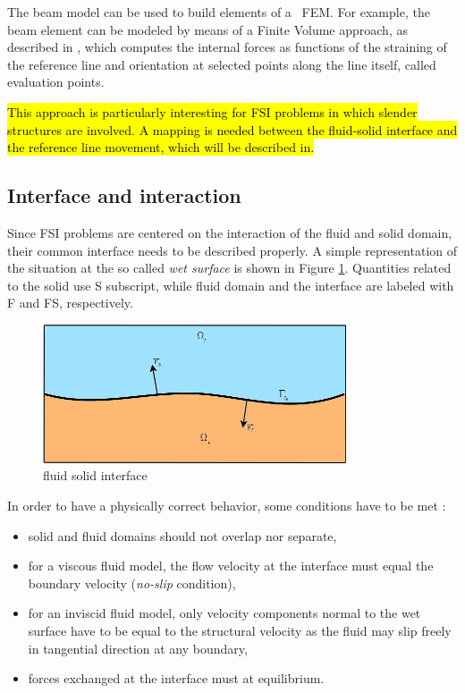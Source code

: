The beam model can be used to build elements of a ~\ac{FEM}. For example, the beam element can be modeled by means of a Finite Volume approach, as described in \cite{ghiringhelli2000multibody}, which computes the internal forces as functions of the straining of the reference line and orientation at selected points along the line itself, called evaluation points.

\hl{This approach is particularly interesting for FSI problems in which slender structures are involved. A mapping is needed between the fluid-solid interface and the reference line movement, which will be described in.}


\subsection{Interface and interaction}
\label{sec:interface}

Since FSI problems are centered on the interaction of the fluid and solid domain, their common interface needs to be described properly. A simple representation of the situation at the so called \textit{wet surface} is shown in Figure \ref{fig:interface}. Quantities related to the solid use S subscript, while fluid domain and the interface are labeled with F and FS, respectively. 

\begin{figure}[htbp!]
	\centering
	\includegraphics[width=0.8\textwidth]{images/interface}
	\caption{fluid solid interface}
	\label{fig:interface}
\end{figure}

In order to have a physically correct behavior, some conditions have to be met \cite{hou2012numerical}:

\begin{itemize}
	\item solid and fluid domains should not overlap nor separate,
	\item for a viscous fluid model, the flow velocity at the interface must equal the boundary velocity (\textit{no-slip} condition),
	\item for an inviscid fluid model, only velocity components normal to the wet surface have to be equal to the structural 	velocity as the fluid may slip freely in tangential direction at any boundary,
	\item forces exchanged at the interface must at equilibrium.
\end{itemize}

